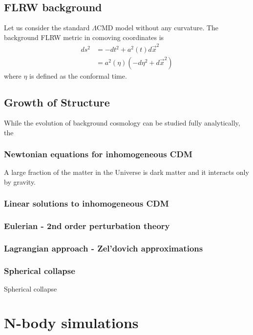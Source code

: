 \documentclass[12pt]{article}
\begin{document}
\subsection{FLRW background}
Let us consider the standard $\Lambda$CMD model without any curvature. The background FLRW metric in comoving coordinates is
\begin{align}
ds^2 &= -dt^2 + a^2(t) d\vec{x}^2\\
&= a^2(\eta) \left( -d\eta^2 + d\vec{x}^2 \right) 
\end{align}
where $\eta$ is defined as the conformal time.


\subsection{Growth of Structure}
While the evolution of background cosmology can be studied fully analytically, the
\subsubsection{Newtonian equations for inhomogeneous CDM}
A large fraction of the matter in the Universe is dark matter and it interacts only by gravity.

\subsubsection{Linear solutions to inhomogeneous CDM}

\subsubsection{Eulerian - 2nd order perturbation theory}

\subsubsection{Lagrangian approach - Zel'dovich approximations}

\subsubsection{Spherical collapse}

Spherical collapse


\section{N-body simulations}
\end{document}
